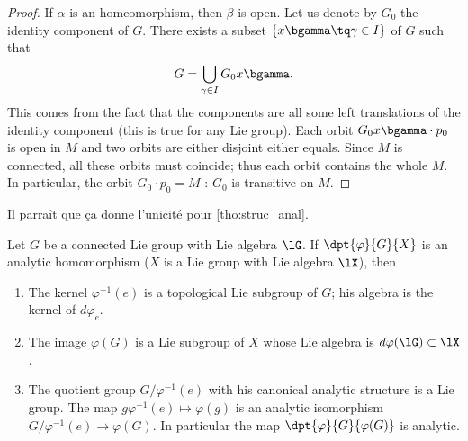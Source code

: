 \begin{proof}
If $\alpha$ is an homeomorphism, then $\beta$ is open. Let us denote by $G_0$ the identity component of $G$. There exists a subset $\{x\bgamma\tq\gamma\in I\}$ of $G$ such that
\[
    G=\bigcup_{\gamma\in I}G_0x\bgamma.
\]
This comes from the fact that the components are all some left translations of the identity component (this is true for any Lie group). Each orbit $G_0x\bgamma\cdot p_0$ is open in $M$ and two orbits are either disjoint either equals. Since $M$ is connected, all these orbits must coincide; thus each orbit contains the whole $M$. In particular, the orbit $G_0\cdot p_0=M$ : $G_0$ is transitive on $M$.

\end{proof}

\begin{probleme}
Il parra\^it que \c ca donne l'unicit\'e pour \ref{tho:struc_anal}.
\end{probleme}


\begin{lemma}
Let $G$ be a connected Lie group with Lie algebra $\lG$. If $\dpt{\varphi}{G}{X}$ is an analytic homomorphism ($X$ is a Lie group with Lie algebra $\lX$), then

\begin{enumerate}
\item The kernel $\varphi^{-1}(e)$ is a topological Lie subgroup of $G$; his algebra is the kernel of $d\varphi_e$.
\item The image $\varphi(G)$ is a Lie subgroup of $X$ whose Lie algebra is $d\varphi(\lG)\subset\lX$.
\item The quotient group $G/\varphi^{-1}(e)$ with his canonical analytic structure is a Lie group. The map $g\varphi^{-1}(e)\mapsto\varphi(g)$ is an analytic isomorphism $G/\varphi^{-1}(e)\to\varphi(G)$. In particular the map $\dpt{\varphi}{G}{\varphi(G)}$ is analytic.
\end{enumerate}
\label{lem:vp_G_X}
\end{lemma}

